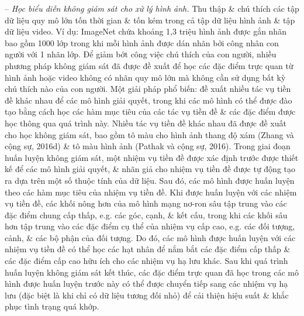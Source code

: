 \documentclass{article}
\begin{document}
\begin{itemize}
\begin{itemize}
\begin{itemize}
            -- {\it Học biểu diễn không giám sát cho xử lý hình ảnh.} Thu thập \& chú thích các tập dữ liệu quy mô lớn tốn thời gian \& tốn kém trong cả tập dữ liệu hình ảnh \& tập dữ liệu video. Ví dụ: ImageNet chứa khoảng 1,3 triệu hình ảnh được gắn nhãn bao gồm 1000 lớp trong khi mỗi hình ảnh được dán nhãn bởi công nhân con người với 1 nhãn lớp. Để giảm bớt công việc chú thích của con người, nhiều phương pháp không giám sát đã được đề xuất để học các đặc điểm trực quan từ hình ảnh hoặc video không có nhãn quy mô lớn mà không cần sử dụng bất kỳ chú thích nào của con người. Một giải pháp phổ biến: đề xuất nhiều tác vụ tiền đề khác nhau để các mô hình giải quyết, trong khi các mô hình có thể được đào tạo bằng cách học các hàm mục tiêu của các tác vụ tiền đề \& các đặc điểm được học thông qua quá trình này. Nhiều tác vụ tiền đề khác nhau đã được đề xuất cho học không giám sát, bao gồm tô màu cho hình ảnh thang độ xám (Zhang và cộng sự, 2016d) \& tô màu hình ảnh (Pathak và cộng sự, 2016). Trong giai đoạn huấn luyện không giám sát, một nhiệm vụ tiền đề được xác định trước được thiết kế để các mô hình giải quyết, \& nhãn giả cho nhiệm vụ tiền đề được tự động tạo ra dựa trên một số thuộc tính của dữ liệu. Sau đó, các mô hình được huấn luyện theo các hàm mục tiêu của nhiệm vụ tiền đề. Khi được huấn luyện với các nhiệm vụ tiền đề, các khối nông hơn của mô hình mạng nơ-ron sâu tập trung vào các đặc điểm chung cấp thấp, e.g. các góc, cạnh, \& kết cấu, trong khi các khối sâu hơn tập trung vào các đặc điểm cụ thể của nhiệm vụ cấp cao, e.g. các đối tượng, cảnh, \& các bộ phận của đối tượng. Do đó, các mô hình được huấn luyện với các nhiệm vụ tiền đề có thể học các hạt nhân để nắm bắt các đặc điểm cấp thấp \& các đặc điểm cấp cao hữu ích cho các nhiệm vụ hạ lưu khác. Sau khi quá trình huấn luyện không giám sát kết thúc, các đặc điểm trực quan đã học trong các mô hình được huấn luyện trước này có thể được chuyển tiếp sang các nhiệm vụ hạ lưu (đặc biệt là khi chỉ có dữ liệu tương đối nhỏ) để cải thiện hiệu suất \& khắc phục tình trạng quá khớp.


\end{itemize}
\end{itemize}
\end{itemize}
\end{document}
